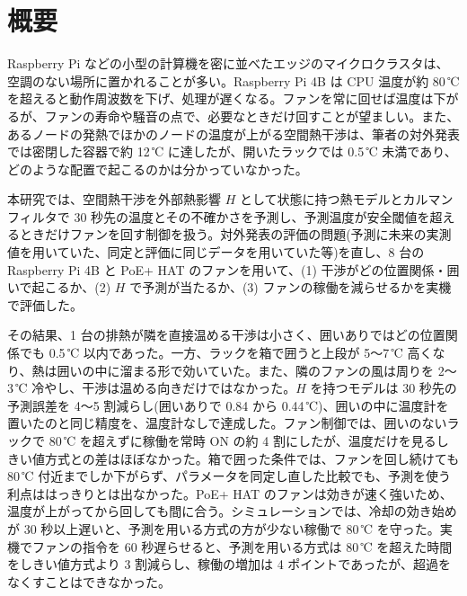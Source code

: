 \chapter*{概要}

\noindent{}

\vspace{1em}
Raspberry Pi などの小型の計算機を密に並べたエッジのマイクロクラスタは、空調のない場所に置かれることが多い。Raspberry Pi 4B は CPU 温度が約 80\,℃ を超えると動作周波数を下げ、処理が遅くなる。ファンを常に回せば温度は下がるが、ファンの寿命や騒音の点で、必要なときだけ回すことが望ましい。また、あるノードの発熱でほかのノードの温度が上がる空間熱干渉は、筆者の対外発表では密閉した容器で約 12\,℃ に達したが、開いたラックでは 0.5\,℃ 未満であり、どのような配置で起こるのかは分かっていなかった。

本研究では、空間熱干渉を外部熱影響 $H$ として状態に持つ熱モデルとカルマンフィルタで 30 秒先の温度とその不確かさを予測し、予測温度が安全閾値を超えるときだけファンを回す制御を扱う。対外発表の評価の問題(予測に未来の実測値を用いていた、同定と評価に同じデータを用いていた等)を直し、8 台の Raspberry Pi 4B と PoE+ HAT のファンを用いて、(1) 干渉がどの位置関係・囲いで起こるか、(2) $H$ で予測が当たるか、(3) ファンの稼働を減らせるかを実機で評価した。

その結果、1 台の排熱が隣を直接温める干渉は小さく、囲いありではどの位置関係でも 0.5\,℃ 以内であった。一方、ラックを箱で囲うと上段が 5〜7\,℃ 高くなり、熱は囲いの中に溜まる形で効いていた。また、隣のファンの風は周りを 2〜3\,℃ 冷やし、干渉は温める向きだけではなかった。$H$ を持つモデルは 30 秒先の予測誤差を 4〜5 割減らし(囲いありで 0.84 から 0.44\,℃)、囲いの中に温度計を置いたのと同じ精度を、温度計なしで達成した。ファン制御では、囲いのないラックで 80\,℃ を超えずに稼働を常時 ON の約 4 割にしたが、温度だけを見るしきい値方式との差はほぼなかった。箱で囲った条件では、ファンを回し続けても 80\,℃ 付近までしか下がらず、パラメータを同定し直した比較でも、予測を使う利点ははっきりとは出なかった。PoE+ HAT のファンは効きが速く強いため、温度が上がってから回しても間に合う。シミュレーションでは、冷却の効き始めが 30 秒以上遅いと、予測を用いる方式の方が少ない稼働で 80\,℃ を守った。実機でファンの指令を 60 秒遅らせると、予測を用いる方式は 80\,℃ を超えた時間をしきい値方式より 3 割減らし、稼働の増加は 4 ポイントであったが、超過をなくすことはできなかった。
